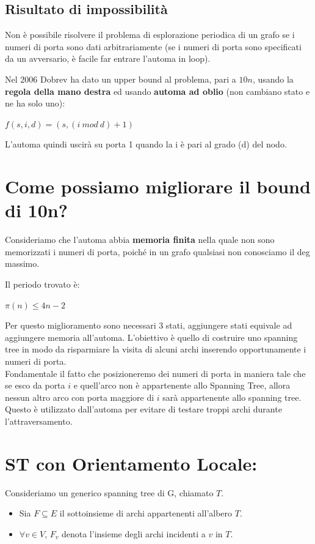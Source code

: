 \subsection*{Risultato di impossibilità}
Non è possibile risolvere il problema di esplorazione periodica di un grafo se i
numeri di porta sono dati arbitrariamente (se i numeri di porta sono specificati
da un avversario, è facile far entrare l'automa in loop).

Nel 2006 Dobrev ha dato un upper bound al problema, pari a $10n$, usando la
\textbf{regola della mano destra} ed usando \textbf{automa ad oblio} (non
cambiano stato e ne ha solo uno):
\begin{center}
    $f(s,i,d) = (s,(i~mod~d) + 1)$
\end{center}
L'automa quindi uscirà su porta 1 quando la i è pari al grado (d) del nodo.

\section{Come possiamo migliorare il bound di 10n?}
Consideriamo che l'automa abbia \textbf{memoria finita} nella quale non sono
memorizzati i numeri di porta, poiché in un grafo qualsiasi non conosciamo il
deg massimo.

Il periodo trovato è:
\begin{center}
    $\pi(n) \leq 4n-2$
\end{center}
Per questo miglioramento sono necessari 3 stati, aggiungere stati equivale ad
aggiungere memoria all'automa. L'obiettivo è quello di costruire uno spanning
tree in modo da risparmiare la visita di alcuni archi inserendo opportunamente i
numeri di porta. \\
Fondamentale il fatto che posizioneremo dei numeri di porta in maniera tale che
se esco da porta $i$ e quell'arco non è appartenente allo Spanning Tree, allora
nessun altro arco con porta maggiore di $i$ sarà appartenente allo spanning
tree. Questo è utilizzato dall'automa per evitare di testare troppi archi
durante l'attraversamento.

\section{ST con Orientamento Locale:}
Consideriamo un generico spanning tree di G, chiamato $T$.
\begin{itemize}
    \item Sia $F \subseteq E$ il sottoinsieme di archi appartenenti all'albero
          $T$.
    \item $\forall v \in V$, $F_v$ denota l'insieme degli archi incidenti a $v$ in
          $T$.
\end{itemize}

